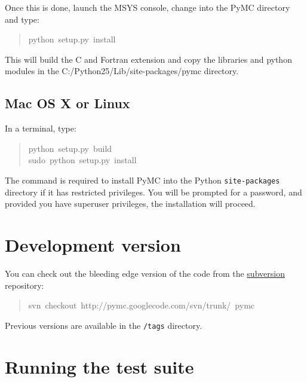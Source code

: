 Once this is done, launch the MSYS console, change into the PyMC directory and
type:
\begin{quote}{\ttfamily \raggedright \noindent
python~setup.py~install
}\end{quote}

This will build the C and Fortran extension and copy the libraries and python
modules in the C:/Python25/Lib/site-packages/pymc directory.



\hypertarget{mac-os-x-or-linux}{}
\subsection{Mac OS X or Linux}
\label{mac-os-x-or-linux}

In a terminal, type:
\begin{quote}{\ttfamily \raggedright \noindent
python~setup.py~build~\\
sudo~python~setup.py~install
}\end{quote}

The  command is required to install PyMC into the Python \texttt{site-packages}
directory if it has restricted privileges. You will be prompted for a password,
and provided you have superuser privileges, the installation will proceed.



\hypertarget{development-version}{}
\section{Development version}
\label{development-version}

You can check out the bleeding edge version of the code from the \href{http://subversion.tigris.org/}{subversion}
repository:
\begin{quote}{\ttfamily \raggedright \noindent
svn~checkout~http://pymc.googlecode.com/svn/trunk/~pymc
}\end{quote}

Previous versions are available in the \texttt{/tags} directory.



\hypertarget{running-the-test-suite}{}
\section{Running the test suite}
\label{running-the-test-suite}

